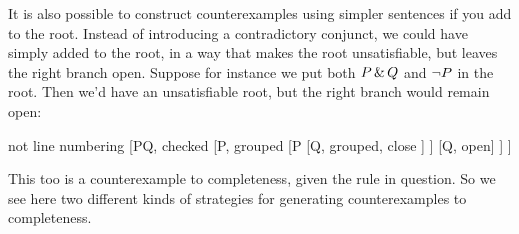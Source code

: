 It is also possible to construct counterexamples using simpler sentences if you add to the root. Instead of introducing a contradictory conjunct, we could have simply added to the root, in a way that makes the root unsatisfiable, but leaves the right branch open. Suppose for instance we put both $P \,\&\, Q$ and $\neg P$ in the root. Then we'd have an unsatisfiable root, but the right branch would remain open:
	\begin{center}
	\begin{prooftree}
	{not line numbering}
	[P\eand Q, checked
	[\enot P, grouped
		[P
		[Q, grouped, close
		]
		]
		[Q, open]
	]
	]
\end{prooftree}
\end{center}

This too is a counterexample to completeness, given the rule in question. So we see here two different kinds of strategies for generating counterexamples to completeness.

\practiceproblems

